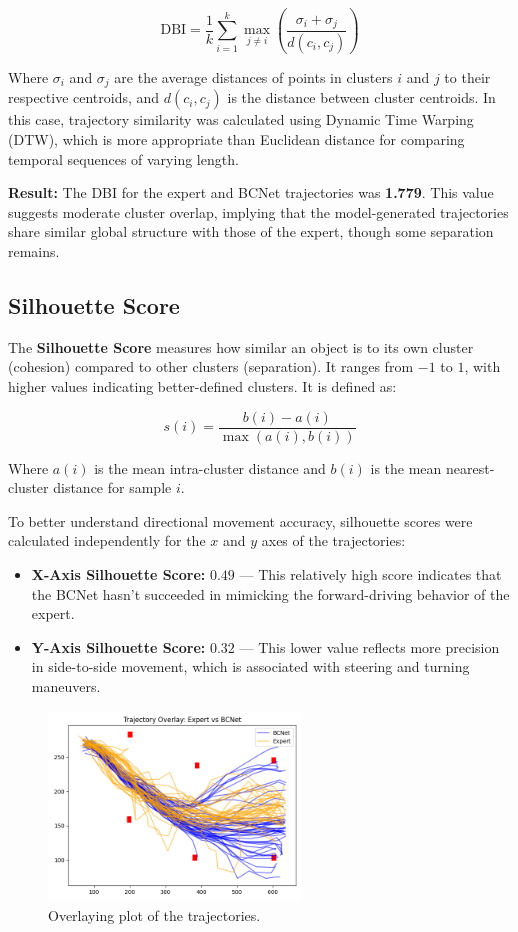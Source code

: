 \[
  \text{DBI} = \frac{1}{k} \sum_{i=1}^{k} \max_{j \ne i} \left( \frac{\sigma_i + \sigma_j}{d(c_i, c_j)} \right)
\]

Where $\sigma_i$ and $\sigma_j$ are the average distances of points in clusters $i$ and $j$ to their respective centroids, and $d(c_i, c_j)$ is the distance between cluster centroids. In this case, trajectory similarity was calculated using Dynamic Time Warping (DTW), which is more appropriate than Euclidean distance for comparing temporal sequences of varying length.

\textbf{Result:} The DBI for the expert and BCNet trajectories was \textbf{1.779}. This value suggests moderate cluster overlap, implying that the model-generated trajectories share similar global structure with those of the expert, though some separation remains.

\subsection{Silhouette Score}

The \textbf{Silhouette Score} \autocite{kaufman2009finding} measures how similar an object is to its own cluster (cohesion) compared to other clusters (separation). It ranges from $-1$ to $1$, with higher values indicating better-defined clusters. It is defined as:

\[
  s(i) = \frac{b(i) - a(i)}{\max(a(i), b(i))}
\]

Where $a(i)$ is the mean intra-cluster distance and $b(i)$ is the mean nearest-cluster distance for sample $i$.

To better understand directional movement accuracy, silhouette scores were calculated independently for the $x$ and $y$ axes of the trajectories:

\begin{itemize}
  \item \textbf{X-Axis Silhouette Score:} $0.49$ — This relatively high score indicates that the BCNet hasn't succeeded in mimicking the forward-driving behavior of the expert.
  \item \textbf{Y-Axis Silhouette Score:} $0.32$ — This lower value reflects more precision in side-to-side movement, which is associated with steering and turning maneuvers.
\end{itemize}

\begin{figure}[htbp]
  \centering
  \includegraphics[width=0.6\textwidth]{Images/Evaluation/trajectory_overlay.png}
  \caption{Overlaying plot of the trajectories.}
  \label{fig:trajectory_overlay}
\end{figure}

